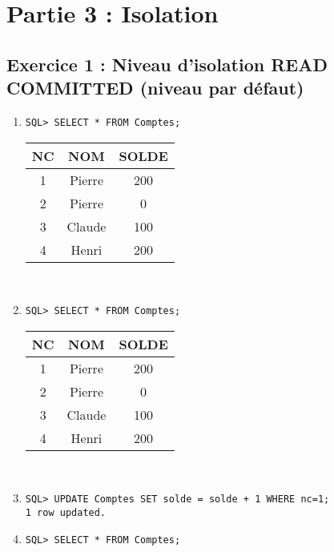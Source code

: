 \documentclass{article}
\begin{document}
\section*{Partie 3 : Isolation}

\subsection*{Exercice 1 : Niveau d'isolation READ COMMITTED (niveau par défaut)}

\begin{enumerate}[label=\arabic*)]
	\item {}
		\begin{lstlisting}
SQL> SELECT * FROM Comptes;
		\end{lstlisting}

\begin{tabular}{|c|c|c|}
	\hline
        	NC & NOM & SOLDE \\
	\hline        
 	1 & Pierre & 200 \\
	\hline         
	2 & Pierre & 0 \\
	\hline
	3 & Claude & 100 \\
	\hline
	4 & Henri & 200 \\
	\hline
\end{tabular} \\

	\item {}
		\begin{lstlisting}
SQL> SELECT * FROM Comptes;
		\end{lstlisting}

\begin{tabular}{|c|c|c|}
	\hline
        	NC & NOM & SOLDE \\
	\hline        
 	1 & Pierre & 200 \\
	\hline         
	2 & Pierre & 0 \\
	\hline
	3 & Claude & 100 \\
	\hline
	4 & Henri & 200 \\
	\hline
\end{tabular} \\

	\item {}
		\begin{lstlisting}
SQL> UPDATE Comptes SET solde = solde + 1 WHERE nc=1;
1 row updated.
		\end{lstlisting}

	\item {} 
		\begin{lstlisting}
SQL> SELECT * FROM Comptes;
		\end{lstlisting}


\end{enumerate}
\end{document}

